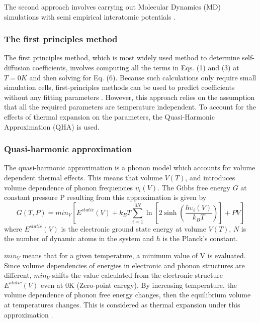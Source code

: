 \documentclass{article}
\begin{document}
The second approach involves carrying out Molecular Dynamics (MD) simulations with semi empirical interatomic potentials \cite{Mendelev2009}.

\subsubsection{The first principles method}

The first principles method, which is most widely used method to determine self-diffusion coefficients, involves computing all the terms in Eqs. (1) and (3) at $T=0K$ and then solving for Eq. (6). Because such calculations only require small simulation cells, first-principles methods can be used to predict coefficients without any fitting parameters \cite{Mantina2008}. However, this approach relies on the assumption that all the required parameters are temperature independent. To account for the effects of thermal expansion on the parameters, the Quasi-Harmonic Approximation (QHA) is used.

\subsubsection*{Quasi-harmonic approximation}

The quasi-harmonic approximation is a phonon model which accounts for volume dependent thermal effects. This means that volume $V(T)$, and introduces volume dependence of phonon frequencies $\upsilon_i(V)$. The Gibbs free energy $G$ at constant pressure P resulting from this approximation is given by
%
\begin{equation}
G(T, P)=min_V\left[E^{static}(V) +  k_B T\sum_{i=1}^{3N} \ln \left[2 \sinh \left(\dfrac{h \upsilon_i(V)}{k_B T}\right)\right] + PV\right]
\end{equation}
%
where $E^{static}(V)$ is the electronic ground state energy at volume $V(T)$, $N$ is the number of dynamic atoms in the system and $h$ is the Planck's constant. 

$min_V$ means that for a given temperature, a minimum value of V is evaluated. Since volume dependencies of energies in electronic and phonon structures are different, $min_V$ shifts the value calculated from the electronic structure $E^{static}(V)$ even at 0K (Zero-point enregy). By increasing temperature, the volume dependence of phonon free energy changes, then the equilibrium volume at temperatures changes. This is considered as thermal expansion under this approximation \cite{Togo2010}.
\end{document}
